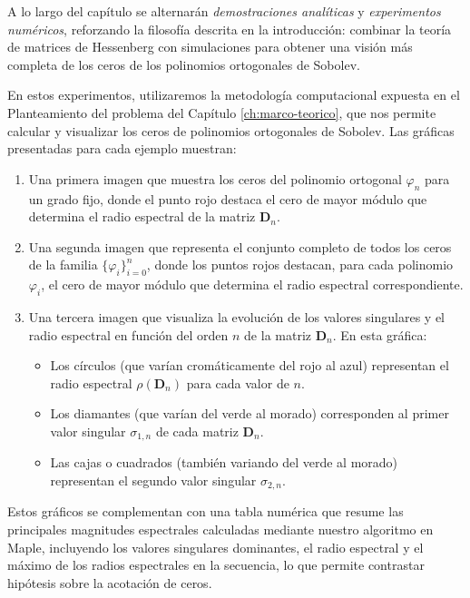 A lo largo del capítulo se alternarán \emph{demostraciones analíticas} y \emph{experimentos numéricos}, reforzando la filosofía descrita en la introducción: combinar la teoría de matrices de Hessenberg con simulaciones para obtener una visión más completa de los ceros de los polinomios ortogonales de Sobolev.

En estos experimentos, utilizaremos la metodología computacional expuesta en el Planteamiento del problema del Capítulo \ref{ch:marco-teorico}, que nos permite calcular y visualizar los ceros de polinomios ortogonales de Sobolev. Las gráficas presentadas para cada ejemplo muestran:

\begin{enumerate}
	\item Una primera imagen que muestra los ceros del polinomio ortogonal $\varphi_n$ para un grado fijo, donde el punto rojo destaca el cero de mayor módulo que determina el radio espectral de la matriz $\mathbf{D}_n$.

	\item Una segunda imagen que representa el conjunto completo de todos los ceros de la familia $\{\varphi_i\}_{i=0}^n$, donde los puntos rojos destacan, para cada polinomio $\varphi_i$, el cero de mayor módulo que determina el radio espectral correspondiente.

	\item Una tercera imagen que visualiza la evolución de los valores singulares y el radio espectral en función del orden $n$ de la matriz $\mathbf{D}_n$. En esta gráfica:
	      \begin{itemize}
		      \item Los círculos (que varían cromáticamente del rojo al azul) representan el radio espectral $\rho(\mathbf{D}_n)$ para cada valor de $n$.
		      \item Los diamantes (que varían del verde al morado) corresponden al primer valor singular $\sigma_{1,n}$ de cada matriz $\mathbf{D}_n$.
		      \item Las cajas o cuadrados (también variando del verde al morado) representan el segundo valor singular $\sigma_{2,n}$.
	      \end{itemize}
\end{enumerate}

Estos gráficos se complementan con una tabla numérica que resume las principales magnitudes espectrales calculadas mediante nuestro algoritmo en Maple, incluyendo los valores singulares dominantes, el radio espectral y el máximo de los radios espectrales en la secuencia, lo que permite contrastar hipótesis sobre la acotación de ceros.

